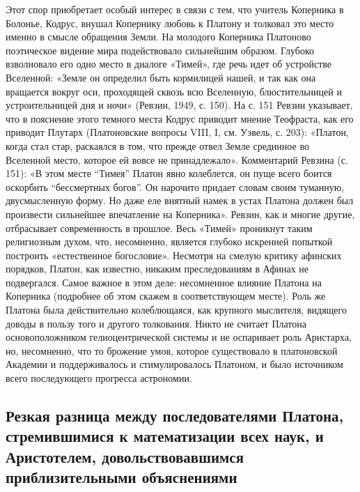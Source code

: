 Этот  спор приобретает  особый  интерес  в связи  с  тем, что  учитель
Коперника  в Болонье,  Кодрус,  внушал Копернику  любовь  к Платону  и
толковал  это  место именно  в  смысле  обращения Земли.  На  молодого
Коперника Платоново поэтическое  видение мира подействовало сильнейшим
образом. Глубоко  взволновало его  одно место  в диалоге  «Тимей», где
речь идет об устройстве Вселенной: «Земле он определил быть кормилицей
нашей,  и так  как она  вращается  вокруг оси,  проходящей сквозь  всю
Вселенную,  блюстительницей и  устроительницей  дня  и ночи»  (Ревзин,
1949,  с. 150).  На с.  151 Ревзин  указывает, что  в пояснение  этого
темного  места  Кодрус приводит  мнение  Теофраста,  как его  приводит
Плутарх (Платоновские вопросы  VIII, I, см. Уэвель,  с. 203): «Платон,
когда стал стар, раскаялся в том,  что прежде отвел Земле срединное во
Вселенной  место,  которое  ей  вовсе  не  принадлежало».  Комментарий
Ревзина  (с. 151):  «В этом  месте ``Тимея''  Платон явно  колеблется,
он  пуще всего  боится  оскорбить ``бессмертных  богов''. Он  нарочито
придает  словам  своим  туманную,  двусмысленную форму.  Но  даже  еле
внятный  намек  в  устах  Платона  должен  был  произвести  сильнейшее
впечатление на  Коперника». Ревзин,  как и многие  другие, отбрасывает
современность  в прошлое.  Весь  «Тимей»  проникнут таким  религиозным
духом, что, несомненно, является  глубоко искренней попыткой построить
«естественное  богословие».   Несмотря  на  смелую   критику  афинских
порядков,  Платон,  как  известно,  никаким  преследованиям  в  Афинах
не  подвергался.  Самое  важное   в  этом  деле:  несомненное  влияние
Платона  на  Коперника (подробнее  об  этом  скажем в  соответствующем
месте). Роль же Платона  была действительно колеблющаяся, как крупного
мыслителя,  видящего  доводы  в  пользу  того  и  другого  толкования.
Никто  не считает  Платона основоположником  гелиоцентрической системы
и  не  оспаривает роль  Аристарха,  но,  несомненно, что  то  брожение
умов, которое  существовало в  платоновской Академии  и поддерживалось
и  стимулировалось  Платоном,  и было  источником  всего  последующего
прогресса астрономии.

\subsection{Резкая    разница     между    последователями    Платона,
стремившимися    к   математизации    всех   наук,    и   Аристотелем,
довольствовавшимся приблизительными объяснениями}

